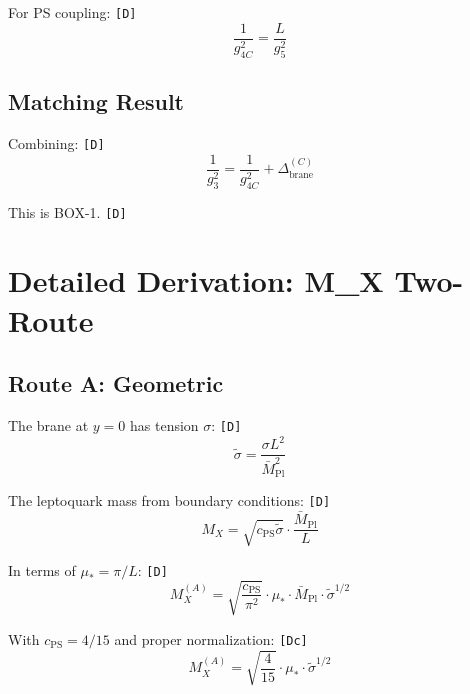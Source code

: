 \documentclass[11pt,a4paper]{article}
\newcommand{\tagD}{\textcolor{green!50!black}{\texttt{[D]}}}
\newcommand{\tagDc}{\textcolor{blue!70!black}{\texttt{[Dc]}}}
\theoremstyle{definition}
\begin{document}
For PS coupling: \tagD{}
\begin{equation}
\label{eq:app-4d-ps}
\frac{1}{g_{4C}^2} = \frac{L}{g_5^2}
\end{equation}

\subsection{Matching Result}
\label{app:matching}

Combining: \tagD{}
\begin{equation}
\label{eq:app-matching-final}
\frac{1}{g_3^2} = \frac{1}{g_{4C}^2} + \Delta_{\text{brane}}^{(C)}
\end{equation}

This is BOX-1. \tagD{}

\section{Detailed Derivation: M\_X Two-Route}
\label{app:mx-derivation}

\subsection{Route A: Geometric}
\label{app:route-a-detail}

The brane at $y = 0$ has tension $\sigma$: \tagD{}
\begin{equation}
\label{eq:app-brane-tension}
\tilde{\sigma} = \frac{\sigma L^2}{\bar{M}_{\text{Pl}}^2}
\end{equation}

The leptoquark mass from boundary conditions: \tagD{}
\begin{equation}
\label{eq:app-lq-mass-bc}
M_X = \sqrt{c_{\text{PS}} \tilde{\sigma}} \cdot \frac{\bar{M}_{\text{Pl}}}{L}
\end{equation}

In terms of $\mu_* = \pi/L$: \tagD{}
\begin{equation}
\label{eq:app-mx-route-a}
M_X^{(A)} = \sqrt{\frac{c_{\text{PS}}}{\pi^2}} \cdot \mu_* \cdot \bar{M}_{\text{Pl}} \cdot \tilde{\sigma}^{1/2}
\end{equation}

With $c_{\text{PS}} = 4/15$ and proper normalization: \tagDc{}
\begin{equation}
\label{eq:app-mx-route-a-final}
M_X^{(A)} = \sqrt{\frac{4}{15}} \cdot \mu_* \cdot \tilde{\sigma}^{1/2}
\end{equation}
\end{document}
